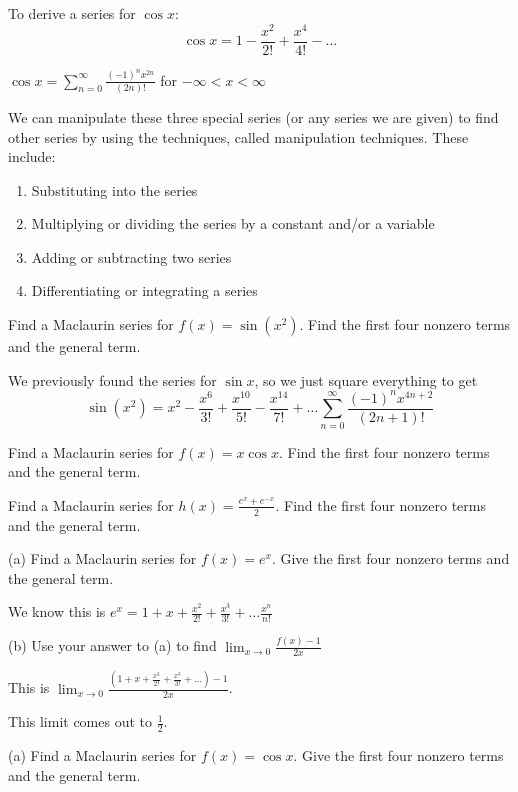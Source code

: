 \documentclass[../bccalc.tex]{subfiles}
\begin{document}
To derive a series for $\cos x$:
\[ \cos x = 1-\frac{x^2}{2!}+\frac{x^4}{4!}-\dots \]
\begin{center}
    $\cos x = \sum_{n=0}^{\infty} \frac{(-1)^n x^{2n}}{(2n)!}$ for $-\infty<x<\infty$
\end{center}

We can manipulate these three special series (or any series we are given) to find other series by using the techniques, called manipulation techniques. These include:
\begin{enumerate}
    \item Substituting into the series 
    \item Multiplying or dividing the series by a constant and/or a variable 
    \item Adding or subtracting two series 
    \item Differentiating or integrating a series 
\end{enumerate}

\begin{example}
    Find a Maclaurin series for $f(x)=\sin(x^2)$. Find the first four nonzero terms and the general term.

    We previously found the series for $\sin x$, so we just square everything to get 
    \[ \sin(x^2)=x^2-\frac{x^6}{3!}+\frac{x^{10}}{5!}-\frac{x^{14}}{7!}+\dots \sum_{n=0}^{\infty}\frac{(-1)^n x^{4n+2}}{(2n+1)!} \]
\end{example}

\ex Find a Maclaurin series for $f(x)=x\cos x$. Find the first four nonzero terms and the general term.

\ex Find a Maclaurin series for $h(x)=\frac{e^x+e^{-x}}{2}$. Find the first four nonzero terms and the general term.

\begin{example}
    (a) Find a Maclaurin series for $f(x)=e^x$. Give the first four nonzero terms and the general term.

    We know this is $e^x=1+x+\frac{x^2}{2!}+\frac{x^3}{3!}+\dots \frac{x^n}{n!}$

    (b) Use your answer to (a) to find $\lim_{x\to 0} \frac{f(x)-1}{2x}$

    This is $\lim_{x\to 0}\frac{(1+x+\frac{x^2}{2!}+\frac{x^3}{3!}+\dots)-1}{2x}$.

    This limit comes out to $\frac{1}{2}$.
\end{example}

\ex (a) Find a Maclaurin series for $f(x)=\cos x$. Give the first four nonzero terms and the general term.
\end{document}
